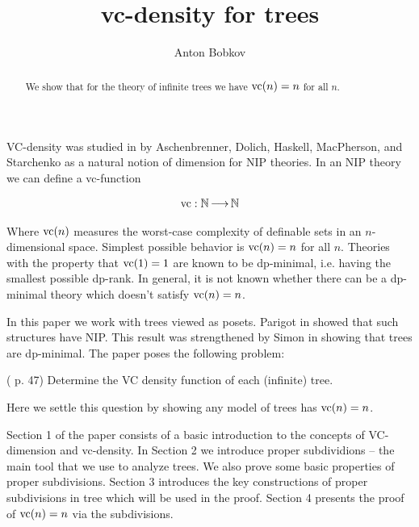 \documentclass{amsart}
\begin{document}
\title{vc-density for trees}
\author{Anton Bobkov}

\begin{abstract}
	We show that for the theory of infinite trees we have $\operatorname{vc}(n) = n$ for all $n$.
\end{abstract}

\maketitle

VC-density was studied in \cite{vc_density} by Aschenbrenner, Dolich, Haskell, MacPherson, and Starchenko as a natural notion of dimension for NIP theories. In an NIP theory we can define a vc-function

\begin{align*}
	\operatorname{vc} : \mathbb{N} \operatorname{\longrightarrow} \mathbb{N}
\end{align*}

Where $\operatorname{vc}(n)$ measures the worst-case complexity of definable sets in an $n$-dimensional space. Simplest possible behavior is $\operatorname{vc}(n) = n$ for all $n$. Theories with the property that $\operatorname{vc}(1) = 1$ are known to be dp-minimal, i.e. having the smallest possible dp-rank. In general, it is not known whether there can be a dp-minimal theory which doesn't satisfy $\operatorname{vc}(n)=n$.

In this paper we work with trees viewed as posets.
Parigot in \cite{parigot_trees} showed that such structures have NIP.
This result was strengthened by Simon in \cite{simon_dp_min} showing that trees are dp-minimal.
The paper \cite{vc_density} poses the following problem:

\begin{Problem} (\cite{vc_density} p. 47)
	Determine the VC density function of each (infinite) tree.
\end{Problem}

Here we settle this question by showing any model of trees has $\operatorname{vc}(n) = n$.

Section 1 of the paper consists of a basic introduction to the concepts of VC-dimension and vc-density.
In Section 2 we introduce proper subdividions -- the main tool that we use to analyze trees.
We also prove some basic properties of proper subdivisions.
Section 3 introduces the key constructions of proper subdivisions in tree which will be used in the proof.
Section 4 presents the proof of $\operatorname{vc}(n) = n$ via the subdivisions.
\end{document}
